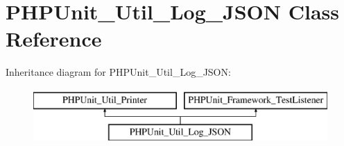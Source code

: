 \hypertarget{class_p_h_p_unit___util___log___j_s_o_n}{}\section{P\+H\+P\+Unit\+\_\+\+Util\+\_\+\+Log\+\_\+\+J\+S\+ON Class Reference}
\label{class_p_h_p_unit___util___log___j_s_o_n}
Inheritance diagram for P\+H\+P\+Unit\+\_\+\+Util\+\_\+\+Log\+\_\+\+J\+S\+ON\+:\begin{figure}[H]
\begin{center}
\leavevmode
\includegraphics[height=2.000000cm]{class_p_h_p_unit___util___log___j_s_o_n}
\end{center}
\end{figure}
